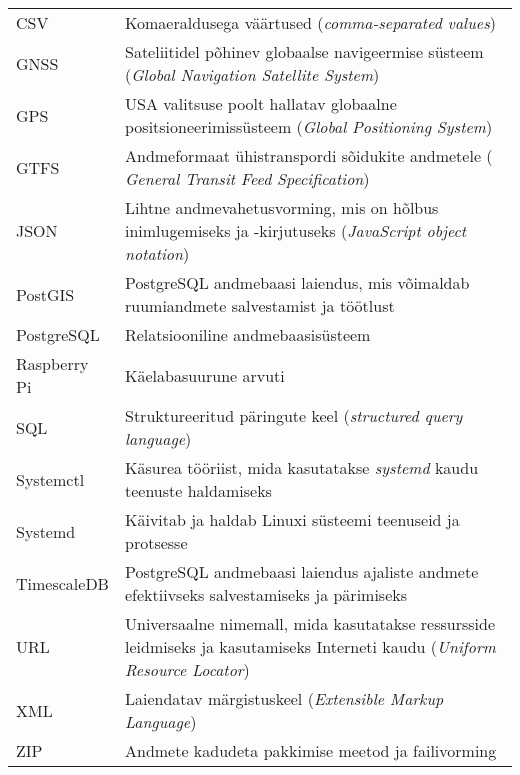 \begin{longtable}{p{3cm}p{10cm}}  %

CSV&Komaeraldusega väärtused (\textit{comma-separated values})\\

GNSS &  Sateliitidel põhinev globaalse navigeermise süsteem (\textit{Global Navigation Satellite System})\\

GPS&USA valitsuse poolt hallatav globaalne positsioneerimissüsteem (\textit{Global Positioning System})\\

GTFS& Andmeformaat ühistranspordi sõidukite andmetele (\textit{ General Transit Feed Specification})\\


JSON & Lihtne andmevahetusvorming, mis
on hõlbus inimlugemiseks ja -kirjutuseks (\textit{JavaScript object notation})\\

PostGIS & PostgreSQL andmebaasi laiendus, mis võimaldab ruumiandmete salvestamist ja töötlust \\

PostgreSQL & Relatsiooniline andmebaasisüsteem  \\

Raspberry Pi & Käelabasuurune arvuti \\

SQL & Struktureeritud päringute keel (\textit{structured query language}) \\

Systemctl & Käsurea tööriist, mida kasutatakse \textit{systemd} kaudu teenuste haldamiseks \\

Systemd &  Käivitab ja haldab Linuxi süsteemi teenuseid ja protsesse \\

TimescaleDB & PostgreSQL andmebaasi laiendus ajaliste andmete efektiivseks salvestamiseks ja pärimiseks \\

URL&Universaalne nimemall, mida kasutatakse ressursside leidmiseks ja kasutamiseks Interneti kaudu (\textit{Uniform Resource Locator})\\

XML&Laiendatav märgistuskeel (\textit{Extensible Markup Language})\\

ZIP&Andmete kadudeta pakkimise meetod ja failivorming \\



\end{longtable}
\addtocounter{table}{-1} %